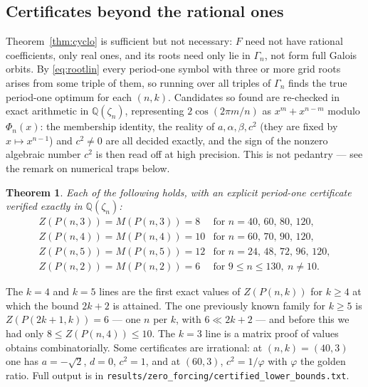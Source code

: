 \documentclass[11pt]{article}
\newtheorem{theorem}{Theorem}
\theoremstyle{definition}
\begin{document}
\subsection*{Certificates beyond the rational ones}
Theorem~\ref{thm:cyclo} is sufficient but not necessary: $F$ need not have
rational coefficients, only real ones, and its roots need only lie in
$\Gamma_n$, not form full Galois orbits. By \eqref{eq:rootlin} every period-one
symbol with three or more grid roots arises from some triple of them, so
running over all triples of $\Gamma_n$ finds the true period-one optimum for
each $(n,k)$. Candidates so found are re-checked in exact arithmetic in
$\mathbb Q(\zeta_n)$, representing $2\cos(2\pi m/n)$ as $x^{m}+x^{n-m}$ modulo
$\Phi_n(x)$: the membership identity, the reality of $a,\alpha,\beta,c^{2}$
(they are fixed by $x\mapsto x^{n-1}$) and $c^{2}\ne0$ are all decided
exactly, and the sign of the nonzero algebraic number $c^{2}$ is then read off
at high precision. This is not pedantry --- see the remark on numerical traps
below.

\begin{theorem}\label{thm:certvals}
Each of the following holds, with an explicit period-one certificate verified
exactly in $\mathbb Q(\zeta_n)$:
\[
\begin{array}{ll}
 Z(P(n,3))=M(P(n,3))=8  & \text{for } n=40,\,60,\,80,\,120,\\
 Z(P(n,4))=M(P(n,4))=10 & \text{for } n=60,\,70,\,90,\,120,\\
 Z(P(n,5))=M(P(n,5))=12 & \text{for } n=24,\,48,\,72,\,96,\,120,\\
 Z(P(n,2))=M(P(n,2))=6  & \text{for } 9\le n\le130,\ n\ne10 .
\end{array}
\]
\end{theorem}

\noindent
The $k=4$ and $k=5$ lines are the first exact values of $Z(P(n,k))$ for
$k\ge4$ at which the bound $2k+2$ is attained. The one previously known family
for $k\ge5$ is $Z(P(2k+1,k))=6$ \cite[Thm.~2.6]{RST} --- one $n$ per $k$, with
$6\ll2k+2$ --- and before this we had only $8\le Z(P(n,4))\le10$. The $k=3$ line is a matrix
proof of values \cite{K} obtains combinatorially. Some certificates are
irrational: at $(n,k)=(40,3)$ one has $a=-\sqrt2$, $d=0$, $c^{2}=1$, and at
$(60,3)$, $c^{2}=1/\varphi$ with $\varphi$ the golden ratio. Full output is in
\texttt{results/zero\_forcing/certified\_lower\_bounds.txt}.
\end{document}
